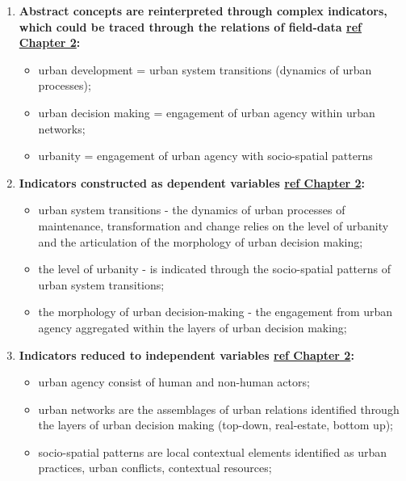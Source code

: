 \documentclass[11pt]{report}
\begin{document}
\begin{enumerate}
\item \textbf{Abstract concepts are reinterpreted through complex indicators, which could be traced through the relations of field-data \href{}{ref Chapter 2}:}

\begin{itemize}
\item urban development = urban system transitions (dynamics of urban processes);
\item urban decision making = engagement of urban agency within urban networks;
\item urbanity = engagement of urban agency with socio-spatial patterns
\end{itemize}

\item \textbf{Indicators constructed as dependent variables \href{}{ref Chapter 2}:}
\begin{itemize}
\item urban system transitions - the dynamics of urban processes of maintenance, transformation and change relies on the level of urbanity and the articulation of the morphology of urban decision making;
\item the level of urbanity - is indicated through the socio-spatial patterns of urban system transitions;
\item the morphology of urban decision-making - the engagement from urban agency aggregated within the layers of urban decision making;
\end{itemize}

\item \textbf{Indicators reduced to independent variables \href{}{ref Chapter 2}:}
\begin{itemize}
\item urban agency consist of human and non-human actors;
\item urban networks are the assemblages of urban relations identified through the layers of urban decision making (top-down, real-estate, bottom up);
\item socio-spatial patterns are local contextual elements identified as urban practices, urban conflicts, contextual resources;
\end{itemize}
\end{enumerate}
\end{document}
